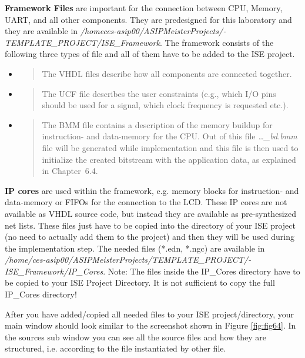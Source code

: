 \textbf{Framework Files} are important for the connection between CPU,
Memory, UART, and all other components. They are predesigned for this
laboratory and they are available in
\emph{/homeces-asip00/­ASIPMeisterProjects/­TEMPLATE\_PROJECT/­ISE\_Framework}.
The framework consists of the following three types of file and all of
them have to be added to the ISE project.

\begin{itemize}
\item
  \begin{quote}
  The VHDL files describe how all components are connected together.
  \end{quote}
\item
  \begin{quote}
  The UCF file describes the user constraints (e.g., which I/O pins
  should be used for a signal, which clock frequency is requested etc.).
  \end{quote}
\item
  \begin{quote}
  The BMM file contains a description of the memory buildup for
  instruction- and data-memory for the CPU. Out of this file
  \emph{\ldots\_bd.bmm} file will be generated while implementation and
  this file is then used to initialize the created bitstream with the
  application data, as explained in Chapter~6.4.
  \end{quote}
\end{itemize}

\textbf{IP cores} are used within the framework, e.g. memory blocks for
instruction- and data-memory or FIFOs for the connection to the LCD.
These IP cores are not available as VHDL source code, but instead they
are available as pre-synthesized net lists. These files just have to be
copied into the directory of your ISE project (no need to actually add
them to the project) and then they will be used during the
implementation step. The needed files (*.edn, *.ngc) are available in
\emph{/home/ces-asip00/­ASIPMeisterProjects/­TEMPLATE\_PROJECT/­ISE\_Framework/­IP\_­Cores}.
Note: The files {inside} the IP\_Cores directory have to be copied to
your ISE Project Directory. It is not sufficient to copy the full
IP\_Cores directory!

After you have added/copied all needed files to your ISE
project/directory, your main window should look similar to the
screenshot shown in Figure \ref{fig:fig64}. In the
sources sub window you can see all the source files and how they are
structured, i.e. according to the file instantiated by other file.

